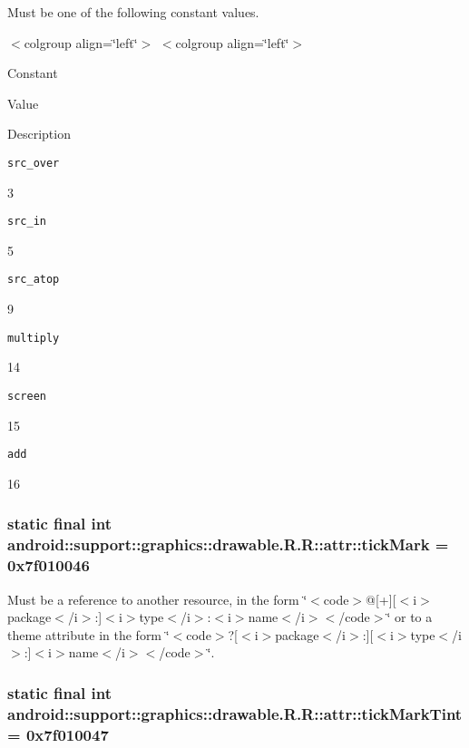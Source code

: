 Must be one of the following constant values. \begin{TabularC}{0}
\hline
\end{TabularC}
$<$colgroup align=\char`\"{}left\char`\"{}$>$ $<$colgroup align=\char`\"{}left\char`\"{}$>$ 

Constant

Value

Description 

{\tt src\_\-over}

3

{\tt src\_\-in}

5

{\tt src\_\-atop}

9

{\tt multiply}

14

{\tt screen}

15

{\tt add}

16\hypertarget{classandroid_1_1support_1_1graphics_1_1drawable_1_1_r_1_1attr_f9493f05bc2cf87944d2ca020b89cc3e}{
\subsubsection[{tickMark}]{\setlength{\rightskip}{0pt plus 5cm}static final int android::support::graphics::drawable.R.R::attr::tickMark = 0x7f010046}}
\label{classandroid_1_1support_1_1graphics_1_1drawable_1_1_r_1_1attr_f9493f05bc2cf87944d2ca020b89cc3e}


Must be a reference to another resource, in the form \char`\"{}$<$code$>$@\mbox{[}+\mbox{]}\mbox{[}$<$i$>$package$<$/i$>$:\mbox{]}$<$i$>$type$<$/i$>$:$<$i$>$name$<$/i$>$$<$/code$>$\char`\"{} or to a theme attribute in the form \char`\"{}$<$code$>$?\mbox{[}$<$i$>$package$<$/i$>$:\mbox{]}\mbox{[}$<$i$>$type$<$/i$>$:\mbox{]}$<$i$>$name$<$/i$>$$<$/code$>$\char`\"{}. \hypertarget{classandroid_1_1support_1_1graphics_1_1drawable_1_1_r_1_1attr_e585f8fde2b85f5ffd1eb20baf216189}{
\subsubsection[{tickMarkTint}]{\setlength{\rightskip}{0pt plus 5cm}static final int android::support::graphics::drawable.R.R::attr::tickMarkTint = 0x7f010047}}
\label{classandroid_1_1support_1_1graphics_1_1drawable_1_1_r_1_1attr_e585f8fde2b85f5ffd1eb20baf216189}


